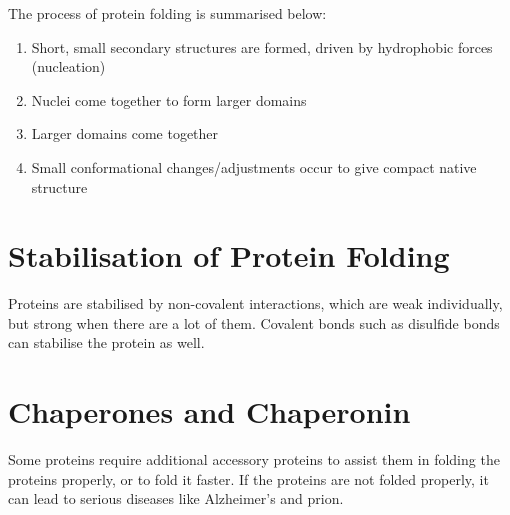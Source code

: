 \vspace{0.5cm}

\noindent
The process of protein folding is summarised below:
\begin{enumerate}
\item Short, small secondary structures are formed, driven by hydrophobic forces (nucleation)
\item Nuclei come together to form larger domains
\item Larger domains come together
\item Small conformational changes/adjustments occur to give compact native structure
\end{enumerate}

\section{Stabilisation of Protein Folding}

Proteins are stabilised by non-covalent interactions, which are weak individually, but strong when there are a lot of them.
Covalent bonds such as disulfide bonds can stabilise the protein as well.

\section{Chaperones and Chaperonin}

Some proteins require additional accessory proteins to assist them in folding the proteins properly, or to fold it faster.
If the proteins are not folded properly, it can lead to serious diseases like Alzheimer's and prion.

